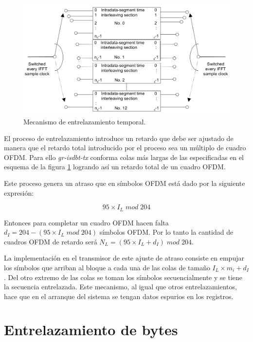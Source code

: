 \begin{figure}[!h]
	\centering
	\includegraphics[scale=0.4]{figuras/cap05/entrelazamiento_temporal}
	\caption{\label{f:entrelazamiento_temporal} Mecanismo de entrelazamiento temporal.}
\end{figure}

El proceso de entrelazamiento introduce un retardo que debe ser ajustado de manera que el retardo total introducido por el proceso sea un m\'ultiplo de cuadro OFDM. Para ello \textit{gr-isdbt-tx} conforma colas m\'as largas de las especificadas en el esquema de la figura \ref{f:entrelazamiento_temporal} logrando as\'i un retardo total de un cuadro OFDM.

Este proceso genera un atraso que en símbolos OFDM está dado por la siguiente expresión:

\begin{equation}
95 \times I_L \; mod \; 204
\end{equation}

Entonces para completar un cuadro OFDM hacen falta $d_I = 204 - (95 \times I_L \; mod \; 204)$ s\'imbolos OFDM. Por lo tanto la cantidad de cuadros OFDM de retardo ser\'a $N_L = (95 \times I_L +d_I) \; mod \; 204$.

La implementaci\'on en el transmisor de este ajuste de atraso consiste en empujar los s\'imbolos que arriban al bloque a cada una de las colas de tamaño $I_L \times m_i + d_I$. Del otro extremo de las colas se toman los s\'imbolos secuencialmente y se tiene la secuencia entrelazada. Este mecanismo, al igual que otros entrelazamientos, hace que en el arranque del sistema se tengan datos espurios en los registros. 

\section{Entrelazamiento de bytes}

